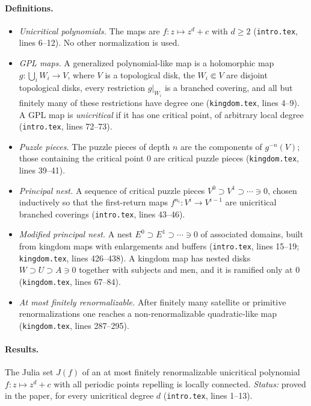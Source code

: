 \paragraph{Definitions.}
\begin{itemize}
\item \emph{Unicritical polynomials.}  The maps are $f\colon z\mapsto z^d+c$ with $d\ge2$ (\texttt{intro.tex},
lines 6--12).  No other normalization is used.
\item \emph{GPL maps.}  A generalized polynomial-like map is a holomorphic map $g\colon\bigcup_iW_i\to V$, where $V$
is a topological disk, the $W_i\Subset V$ are disjoint topological disks, every restriction $g|_{W_i}$ is a
branched covering, and all but finitely many of these restrictions have degree one (\texttt{kingdom.tex},
lines 4--9).  A GPL map is \emph{unicritical} if it has one critical point, of arbitrary local degree (\texttt{intro.tex},
lines 72--73).
\item \emph{Puzzle pieces.}  The puzzle pieces of depth $n$ are the components of $g^{-n}(V)$; those containing the
critical point $0$ are critical puzzle pieces (\texttt{kingdom.tex}, lines 39--41).
\item \emph{Principal nest.}  A sequence of critical puzzle pieces $V^0\supset V^1\supset\cdots\ni0$, chosen inductively
so that the first-return maps $f^{n_i}\colon V^i\to V^{i-1}$ are unicritical branched coverings (\texttt{intro.tex},
lines 43--46).
\item \emph{Modified principal nest.}  A nest $E^0\supset E^1\supset\cdots\ni0$ of associated domains, built from kingdom
maps with enlargements and buffers (\texttt{intro.tex}, lines 15--19; \texttt{kingdom.tex}, lines 426--438).  A kingdom
map has nested disks $W\supset U\supset A\ni0$ together with subjects and men, and it is ramified only at $0$
(\texttt{kingdom.tex}, lines 67--84).
\item \emph{At most finitely renormalizable.}  After finitely many satellite or primitive renormalizations one reaches a
non-renormalizable quadratic-like map (\texttt{kingdom.tex}, lines 287--295).
\end{itemize}

\paragraph{Results.}

\begin{theorem}
\label{thm:kl-unicritical-A}
The Julia set $J(f)$ of an at most finitely renormalizable unicritical polynomial $f\colon z\mapsto z^d+c$ with all
periodic points repelling is locally connected.  \emph{Status:} proved in the paper, for every unicritical degree $d$
(\texttt{intro.tex}, lines 1--13).
\end{theorem}

